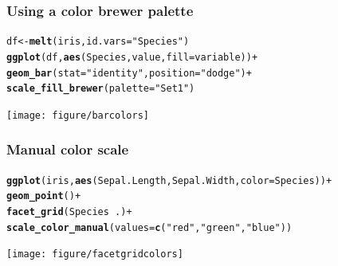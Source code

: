 \documentclass{beamer}\usepackage[]{graphicx}\usepackage[]{color}
\makeatletter
\newcommand{\hlstr}[1]{\textcolor[rgb]{0.192,0.494,0.8}{#1}}%
\newcommand{\hlkwd}[1]{\textcolor[rgb]{0.737,0.353,0.396}{\textbf{#1}}}%
\newenvironment{kframe}{%
 \def\at@end@of@kframe{}%
 \ifinner\ifhmode%
  \def\at@end@of@kframe{\end{minipage}}%
  \begin{minipage}{\columnwidth}%
 \fi\fi%
 \def\FrameCommand##1{\hskip\@totalleftmargin \hskip-\fboxsep
 \colorbox{shadecolor}{##1}\hskip-\fboxsep
     \hskip-\linewidth \hskip-\@totalleftmargin \hskip\columnwidth}%
 \MakeFramed {\advance\hsize-\width
   \@totalleftmargin\z@ \linewidth\hsize
   \@setminipage}}%
 {\par\unskip\endMakeFramed%
 \at@end@of@kframe}
\newenvironment{knitrout}{}{} %
\makeatother
\begin{document}

\begin{frame}[fragile]
\frametitle{Using a color brewer palette}
\begin{knitrout}\footnotesize
{}\color{fgcolor}\begin{kframe}
\begin{alltt}
df  <- \hlkwd{melt}(iris, id.vars = \hlstr{"Species"})
\hlkwd{ggplot}(df, \hlkwd{aes}(Species, value, fill = variable)) +
\hlkwd{geom_bar}(stat = \hlstr{"identity"}, position = \hlstr{"dodge"}) +
\hlkwd{scale_fill_brewer}(palette = \hlstr{"Set1"})
\end{alltt}
\end{kframe}

{\centering \texttt{[image: figure/barcolors]} 

}



\end{knitrout}

\end{frame}


\begin{frame}[fragile]
\frametitle{Manual color scale}
\begin{knitrout}\footnotesize
{}\color{fgcolor}\begin{kframe}
\begin{alltt}
\hlkwd{ggplot}(iris, \hlkwd{aes}(Sepal.Length, Sepal.Width, color = Species)) +
\hlkwd{geom_point}() +
\hlkwd{facet_grid}(Species ~ .) +
\hlkwd{scale_color_manual}(values = \hlkwd{c}(\hlstr{"red"}, \hlstr{"green"}, \hlstr{"blue"}))
\end{alltt}
\end{kframe}

{\centering \texttt{[image: figure/facetgridcolors]} 

}



\end{knitrout}

\end{frame}

\end{document}
